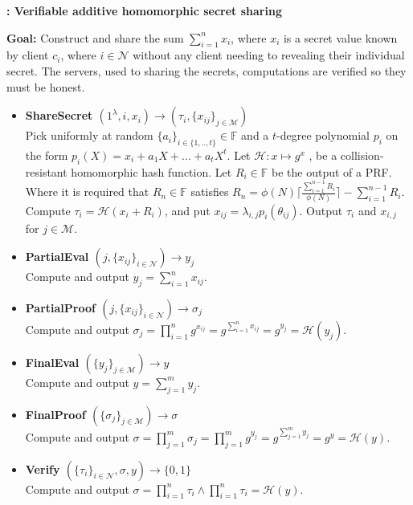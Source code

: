 \begin{algorithm}
\caption{\textbf{: Verifiable additive homomorphic secret sharing}}
\label{alg:VAHSS-HSS}
\textbf{Goal:} Construct and share the sum $\sum_{i=1}^n x_i$, where $x_i$ is a secret value known by client $c_i$, where $i\in\mathcal{N}$ without any client needing to revealing their individual secret. The servers, used to sharing the secrets, computations are verified so they must be honest. 
\vspace{2pt}
\hline 
\vspace{2pt}
\begin{itemize}
  \item\textbf{ShareSecret $(1^\lambda,i,x_i)\xrightarrow[]{}(\tau_i,\{x_{ij}\}_{j\in\mathcal{M}})$}\\
Pick uniformly at random $\{a_i\}_{i\in\{1,..,t\}}\in\mathds{F}$ and a $t$-degree polynomial $p_i$ on the form $p_i(X) = x_i + a_1X+...+a_tX^t$. Let $\mathcal{H}:x\mapsto g^x$
, be a collision-resistant homomorphic hash function. Let $R_i\in\mathds{F}$ be the output of a PRF. Where it is required that  $R_n\in \mathds{F}$  satisfies
$R_n = \phi(N)\lceil \frac{\sum_{i=1}^{n-1}R_i}{\phi(N)}\rceil- \sum_{i=1}^{n-1}R_i $. Compute $\tau_i = \mathcal{H}(x_i+R_i)$, and put $x_{ij}=\lambda_{i,j}p_i(\theta_{ij})$.  Output $\tau_i$ and $x_{i,j}$ for $j\in\mathcal{M}$. 

\item\textbf{PartialEval $(j,\{x_{ij}\}_{i\in\mathcal{N}})\xrightarrow[]{}y_j$}\\
Compute and output $y_j = \sum_{i=1}^n x_{ij}$.

\item\textbf{PartialProof $(j,\{x_{ij}\}_{i\in\mathcal{N}})\xrightarrow[]{}\sigma_j$}\\
Compute and output $\sigma_j = \prod_{i=1}^n g^{x_{ij}} =  g^{\sum_{i=1}^n x_{ij}}= g^{y_j}=\mathcal{H}(y_j)$.

\item\textbf{FinalEval $(\{y_j\}_{j\in\mathcal{M}})\xrightarrow[]{}y$}\\
Compute and output $y = \sum_{j=1}^m y_{j}$.

\item\textbf{FinalProof $(\{\sigma_j\}_{j\in\mathcal{M}})\xrightarrow[]{}\sigma$}\\
Compute and output $\sigma = \prod_{j=1}^m \sigma_j = \prod_{j=1}^m g^{y_{j}} =  g^{\sum_{j=1}^m y_{j}}= g^{y}=\mathcal{H}(y)$.

\item\textbf{Verify $(\{\tau_i\}_{i\in\mathcal{N}},\sigma,y)\xrightarrow[]{}\{0,1\}$}\\
Compute and output $\sigma= \prod_{i=1}^n \tau_i \wedge \prod_{i=1}^n \tau_i = \mathcal{H}(y)$.
\end{itemize}
\end{algorithm}

